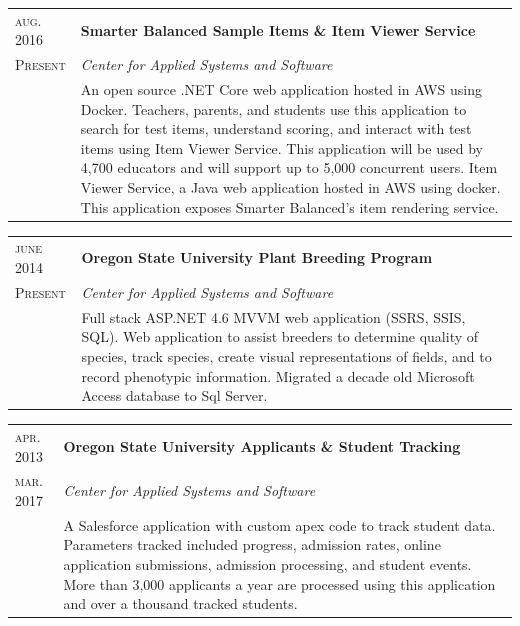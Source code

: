 \documentclass[10pt]{article}
\newenvironment{sectiontable}{ \begin{tabular}{p{16mm}|p{16cm}} }{ \end{tabular} }
\begin{document}
\begin{sectiontable}
{\small\textsc{aug. 2016}} 	& \textbf{Smarter Balanced Sample Items \& Item Viewer Service}\\
{\small\textsc{Present}}  & \emph{Center for Applied Systems and Software}\\
					& \rule{0pt}{2.3ex}\noindent    
An open source .NET Core web application hosted in AWS using Docker. \newline
Teachers, parents, and students use this application to search for test items, understand scoring, and interact with test items using Item Viewer Service. This application will be used by 4,700 educators and will support up to 5,000 concurrent users.
Item Viewer Service, a Java web application hosted in AWS using docker. This application exposes Smarter Balanced's item rendering service.
\end{sectiontable} 


\begin{sectiontable}
{\small\textsc{june 2014}} 	& \textbf{Oregon State University Plant Breeding Program}\\
{\small\textsc{Present}}  & \emph{Center for Applied Systems and Software}\\
					& \rule{0pt}{2.3ex}\noindent    
Full stack ASP.NET 4.6 MVVM web application (SSRS, SSIS, SQL). \newline
Web application to assist breeders to determine quality of species, track species, create visual representations of fields, and to record phenotypic information. Migrated a decade old Microsoft Access database to Sql Server.
\end{sectiontable} 

\begin{sectiontable}
{\small\textsc{apr. 2013}} 	& \textbf{Oregon State University Applicants \& Student Tracking}\\
{\small\textsc{mar. 2017}}  & \emph{Center for Applied Systems and Software}\\
					& \rule{0pt}{2.3ex}\noindent    
A Salesforce application with custom apex code to track student data. \newline 
Parameters tracked included progress, admission rates, online application submissions, admission processing, and student events. More than 3,000 applicants a year are processed using this application and over a thousand tracked students.
\end{sectiontable} 
\end{document}
